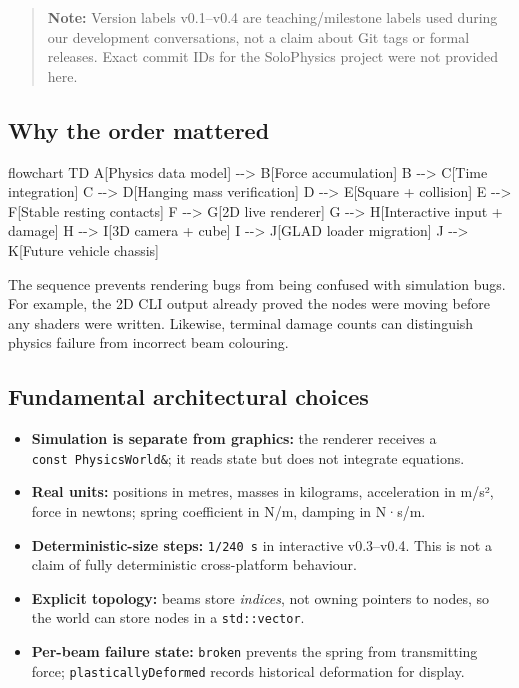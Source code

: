 \documentclass[
  10pt,
  a4paper,
]{article}
\newenvironment{Shaded}{\begin{snugshade}}{\end{snugshade}}
\newcommand{\NormalTok}[1]{#1}
\providecommand{\tightlist}{%
  \setlength{\itemsep}{0pt}\setlength{\parskip}{0pt}}
\begin{document}
\begin{quote}
\textbf{Note:} Version labels v0.1--v0.4 are teaching/milestone labels
used during our development conversations, not a claim about Git tags or
formal releases. Exact commit IDs for the SoloPhysics project were not
provided here.
\end{quote}

\subsection{Why the order mattered}\label{why-the-order-mattered}

\begin{Shaded}
\begin{Highlighting}[]
\NormalTok{flowchart TD}
\NormalTok{ A[Physics data model] {-}{-}\textgreater{} B[Force accumulation]}
\NormalTok{ B {-}{-}\textgreater{} C[Time integration]}
\NormalTok{ C {-}{-}\textgreater{} D[Hanging mass verification]}
\NormalTok{ D {-}{-}\textgreater{} E[Square + collision]}
\NormalTok{ E {-}{-}\textgreater{} F[Stable resting contacts]}
\NormalTok{ F {-}{-}\textgreater{} G[2D live renderer]}
\NormalTok{ G {-}{-}\textgreater{} H[Interactive input + damage]}
\NormalTok{ H {-}{-}\textgreater{} I[3D camera + cube]}
\NormalTok{ I {-}{-}\textgreater{} J[GLAD loader migration]}
\NormalTok{ J {-}{-}\textgreater{} K[Future vehicle chassis]}
\end{Highlighting}
\end{Shaded}

The sequence prevents rendering bugs from being confused with simulation
bugs. For example, the 2D CLI output already proved the nodes were
moving before any shaders were written. Likewise, terminal damage counts
can distinguish physics failure from incorrect beam colouring.

\subsection{Fundamental architectural
choices}\label{fundamental-architectural-choices}

\begin{itemize}
\tightlist
\item
  \textbf{Simulation is separate from graphics:} the renderer receives a
  \texttt{const\ PhysicsWorld\&}; it reads state but does not integrate
  equations.
\item
  \textbf{Real units:} positions in metres, masses in kilograms,
  acceleration in m/s², force in newtons; spring coefficient in N/m,
  damping in N·s/m.
\item
  \textbf{Deterministic-size steps:} \texttt{1/240\ s} in interactive
  v0.3--v0.4. This is not a claim of fully deterministic cross-platform
  behaviour.
\item
  \textbf{Explicit topology:} beams store \emph{indices}, not owning
  pointers to nodes, so the world can store nodes in a
  \texttt{std::vector}.
\item
  \textbf{Per-beam failure state:} \texttt{broken} prevents the spring
  from transmitting force; \texttt{plasticallyDeformed} records
  historical deformation for display.
\end{itemize}
\end{document}
